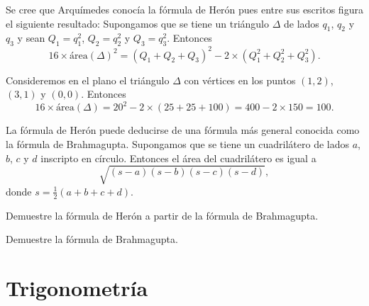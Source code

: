 
Se cree que Arquímedes conocía la fórmula de Herón pues entre sus escritos
figura el siguiente resultado: Supongamos que se tiene un triángulo $\Delta$ de
lados $q_1$, $q_2$ y $q_3$ y sean $Q_1=q_1^2$, $Q_2=q_2^2$ y $Q_3=q_3^2$.
Entonces 
\[
	16\times \textrm{área}(\Delta)^2=(Q_1+Q_2+Q_3)^2-2\times(Q_1^2+Q_2^2+Q_3^2).
\]

\begin{example}
	Consideremos en el plano el triángulo $\Delta$ con vértices en los puntos
	$(1,2)$, $(3,1)$ y $(0,0)$. Entonces
	\[
		16\times\textrm{área}(\Delta)=20^2-2\times(25+25+100)=400-2\times 150=100.
	\]
\end{example}

La fórmula de Herón puede deducirse de una fórmula más general conocida como la
fórmula de Brahmagupta. Supongamos que se tiene un cuadrilátero de lados $a$,
$b$, $c$ y $d$ inscripto en círculo. Entonces el área del cuadrilátero es igual
a 
\[
	\sqrt{(s-a)(s-b)(s-c)(s-d)},
\]
donde $s=\frac12(a+b+c+d)$. 

\begin{exercise}
	Demuestre la fórmula de Herón a partir de la fórmula de Brahmagupta.
\end{exercise}

\begin{exercise}
	Demuestre la fórmula de Brahmagupta.
\end{exercise}


\section*{Trigonometría}

